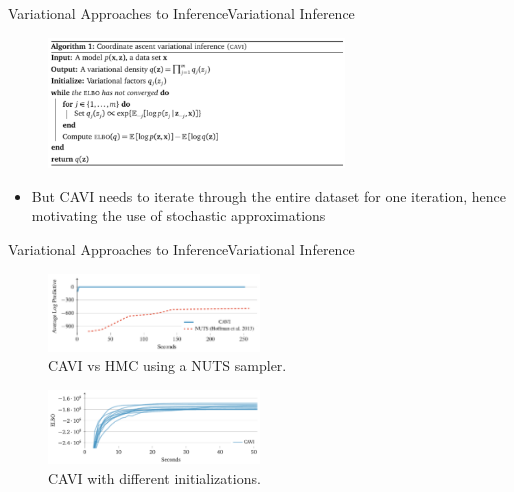 \documentclass[AERbeamer%
              ,optEnglish%
              ,optBiber%
              ,optBibstyleAlphabetic%
              ,optBeamerClassicFormat%
              ]{AERlatex}%
\begin{document}
\begin{frame}[c]{Variational Approaches to Inference}{Variational Inference}
    \centering
    \begin{figure}
        \centering
        \includegraphics[width=0.7\textwidth]{VICAVIAlgo.png}
    \end{figure}
    \begin{itemize}
        \item But CAVI needs to iterate through the entire dataset for one iteration, hence motivating the use of stochastic approximations
    \end{itemize}
\end{frame}


\begin{frame}[c]{Variational Approaches to Inference}{Variational Inference}
    \centering
    \begin{figure}
        \centering
        \includegraphics[width=0.5\textwidth]{VICAVIvsHMC.png}
        \caption{CAVI vs HMC using a NUTS sampler.}
    \end{figure}
    \begin{figure}
        \centering
        \includegraphics[width=0.5\textwidth]{VICAVIELBO.png}
        \caption{CAVI with different initializations.}
    \end{figure}
\end{frame}
\end{document}
